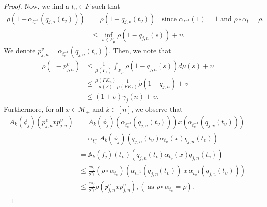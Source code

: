 \documentclass[11pt]{amsart}
\theoremstyle{definition}
\theoremstyle{myremark}
\numberwithin{equation}{section}
\def\A{\mathbb A}
\newcommand{\CM}{\mathcal{M}}
\newcommand{\ups}{\upsilon}
\begin{document}
\begin{proof}
\noindent
Now, we find a \( t_\ups \in F \) such that 
\begin{align*}
	\rho  
	\left( 
	1- \alpha_{t_\ups^{-1}} 
	\left( 
	q_{j,n} 
	\left(t_\ups \right)
	\right) 
	\right) 
	&= \rho \left(1-  q_{j, n} \left(t_\ups \right) 
	\right)  \quad \text{since } \alpha_{t_\ups^{-1}} \left(1 \right) =1 \text{ and } \rho \circ \alpha_{t} = \rho.\\
	&\leq \inf_{s \in F_{\mu}} \rho \left(
	1-  q_{j, n} 
	\left( s \right) 
	\right) + \ups.
\end{align*}
We denote $ p_{j,n}^{v} = \alpha_{t_v^{-1}}(q_{j,n}(t_\ups)).$
Then, we note that 
\begin{align*}
	\rho(1- p_{j, n}^{\ups}) 
	&\leq \frac{1}{\mu(F_{\mu})} \int_{F_{\mu}}  \rho \left(1- q_{j, n}(s) \right) d\mu(s) + \ups\\
	&\leq \frac{\mu(FK_n)}{\mu(F)} \frac{1}{\mu(FK_n)} \tilde{\rho} \left( 1-q_{j, n} \right) + \ups \\
	&\leq ( 1+ \ups)  \gamma_j(n) + \ups.
\end{align*} 
Furthermore,  for all \( x \in  \CM_+ \) and \( k \in [n] \), we observe that
\begin{align*}
	A_k(\phi_j) (  p_{j, n}^{\ups} x p_{j, n}^{ \ups}) 	
	&= A_k(\phi_j) 
    \left( \alpha_{t_\ups^{-1}} \left( q_{j, n}(t_\ups) \right) \right) x  \left( \alpha_{t_\ups^{-1}} \left( q_{j, n}(t_\ups) \right)\right) \\
        &= \alpha_{t_\ups^{-1}} A_k(\phi_j) \left(  q_{j, n}(t_\ups)  \alpha_{t_\ups} (x)   q_{j, n}(t_\ups) \right) \\
&= \A_k(f_j)(t_\ups) \left(  q_{j, n}(t_\ups)  \alpha_{t_\ups} (x)   q_{j, n}(t_\ups) \right)\\
&\leq    \frac{cs_j}{2^{s_j}} (\rho\circ \alpha_{t_\ups} ) \left(   \alpha_{t_\ups^{-1}} \left( q_{j, n}(t_\ups) \right)  ~x  ~\alpha_{t_\ups^{-1}}\left(q_{j, n}(t_\ups) \right) \right)\\ 
&\leq    \frac{c   s_j}{2^{s_j}} \rho \left( p_{j, n}^{ \ups} x p_{j, n}^{\ups} \right), (\text{ as } \rho\circ \alpha_{t_\ups} = \rho ).
\end{align*}






\end{proof}
\end{document}

